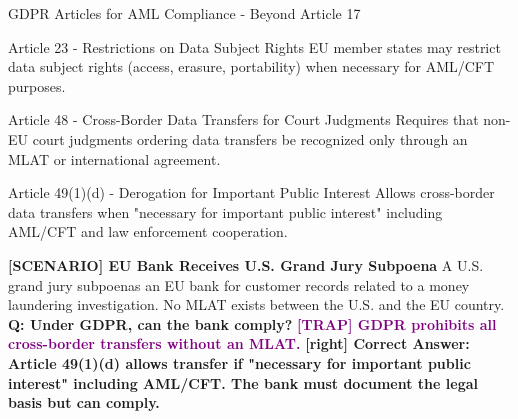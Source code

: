 \documentclass[11pt,a4paper]{beamer}
\newcommand{\trap}[1]{\textcolor{purple}{\textbf{[TRAP] #1}}}
\newcommand{\correct}[1]{\textcolor{green!50!black}{\textbf{[right] #1}}}
\newcommand{\scenario}[1]{\textcolor{blue!70!black}{\textbf{[SCENARIO] #1}}}
\begin{document}
\begin{frame}{GDPR Articles for AML Compliance - Beyond Article 17}
\begin{block}{Article 23 - Restrictions on Data Subject Rights}
EU member states may restrict data subject rights (access, erasure, portability) when necessary for AML/CFT purposes.
\end{block}
\begin{block}{Article 48 - Cross-Border Data Transfers for Court Judgments}
Requires that non-EU court judgments ordering data transfers be recognized only through an MLAT or international agreement.
\end{block}
\begin{block}{Article 49(1)(d) - Derogation for Important Public Interest}
Allows cross-border data transfers when "necessary for important public interest" including AML/CFT and law enforcement cooperation.
\end{block}
\scenario{EU Bank Receives U.S. Grand Jury Subpoena}
A U.S. grand jury subpoenas an EU bank for customer records related to a money laundering investigation. No MLAT exists between the U.S. and the EU country.
\vspace{0.2cm}
\textbf{Q: Under GDPR, can the bank comply?}
\trap{GDPR prohibits all cross-border transfers without an MLAT.}
\correct{Correct Answer: Article 49(1)(d) allows transfer if "necessary for important public interest" including AML/CFT. The bank must document the legal basis but can comply.}
\end{frame}

\end{document}
